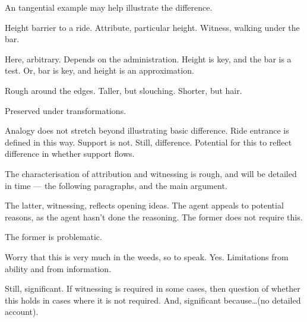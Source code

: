 \documentclass[10pt]{article}
\begin{document}
\begin{note}
  An tangential example may help illustrate the difference.

  Height barrier to a ride.
  Attribute, particular height.
  Witness, walking under the bar.

  Here, arbitrary.
  Depends on the administration.
  Height is key, and the bar is a test.
  Or, bar is key, and height is an approximation.

  Rough around the edges.
  Taller, but slouching.
  Shorter, but hair.

  Preserved under transformations.
\end{note}

\begin{note}
  Analogy does not stretch beyond illustrating basic difference.
  Ride entrance is defined in this way.
  Support is not.
  Still, difference.
  Potential for this to reflect difference in whether support flows.

  The characterisation of attribution and witnessing is rough, and will be detailed in time --- the following paragraphs, and the main argument.

  The latter, witnessing, reflects opening ideas.
  The agent appeals to potential reasons, as the agent hasn't done the reasoning.
  The former does not require this.

  The former is problematic.
\end{note}

\begin{note}
  Worry that this is very much in the weeds, so to speak.
  Yes.
  Limitations from ability and from information.

  Still, significant.
  If witnessing is required in some cases, then question of whether this holds in cases where it is not required.
  And, significant because\dots (no detailed account).
\end{note}
\end{document}
